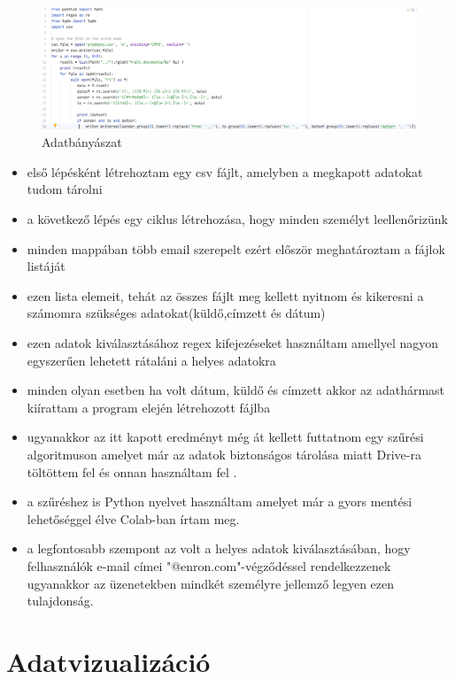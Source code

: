 \begin{figure}[h]
	\centering
	\includegraphics[scale=0.5]{images/adatbanyaszat}
	\caption{Adatbányászat}
\end{figure}

\begin{itemize}

        \item első lépésként létrehoztam egy csv fájlt, amelyben a megkapott adatokat tudom tárolni
	\item a következő lépés egy ciklus létrehozása, hogy minden személyt leellenőrizünk
	\item minden mappában több email szerepelt ezért először meghatároztam a fájlok listáját 
	\item ezen lista elemeit, tehát az összes fájlt meg kellett nyitnom és kikeresni a számomra szükséges adatokat(küldő,címzett és dátum)
	\item ezen adatok kiválasztásához regex kifejezéseket használtam amellyel nagyon egyszerűen lehetett rátaláni a helyes adatokra 
	\item minden olyan esetben ha volt dátum, küldő és címzett akkor az adathármast kiírattam a program elején létrehozott fájlba
        \item  ugyanakkor az itt kapott eredményt még át kellett futtatnom egy szűrési algoritmuson amelyet már az adatok biztonságos tárolása miatt Drive-ra töltöttem fel és onnan használtam fel .
         \item a szűréshez is Python nyelvet használtam amelyet már a gyors mentési lehetőséggel élve Colab-ban írtam meg.
         \item  a legfontosabb szempont az volt a helyes adatok kiválasztásában, hogy felhasználók e-mail címei "@enron.com"-végződéssel rendelkezzenek ugyanakkor az üzenetekben mindkét személyre jellemző legyen ezen tulajdonság.
\end{itemize}




\section {Adatvizualizáció}

